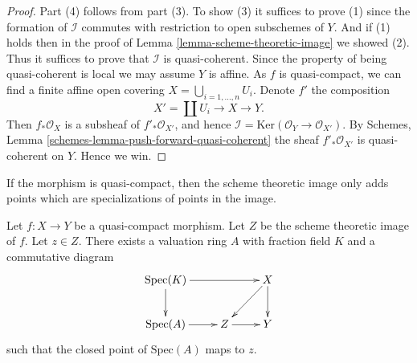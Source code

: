\begin{proof}
Part (4) follows from part (3). To show (3) it suffices
to prove (1) since the formation of $\mathcal{I}$ commutes with restriction to
open subschemes of $Y$. And if (1) holds then in
the proof of Lemma \ref{lemma-scheme-theoretic-image} we showed (2).
Thus it suffices to prove that $\mathcal{I}$ is quasi-coherent.
Since the property of being quasi-coherent is
local we may assume $Y$ is affine. As $f$ is quasi-compact,
we can find a finite affine open covering
$X = \bigcup_{i = 1, \ldots, n} U_i$. Denote $f'$ the composition
$$
X' = \coprod U_i \longrightarrow X \longrightarrow Y.
$$
Then $f_*\mathcal{O}_X$ is a subsheaf of $f'_*\mathcal{O}_{X'}$,
and hence $\mathcal{I} = \text{Ker}(\mathcal{O}_Y \to \mathcal{O}_{X'})$.
By Schemes, Lemma \ref{schemes-lemma-push-forward-quasi-coherent}
the sheaf $f'_*\mathcal{O}_{X'}$ is quasi-coherent on $Y$. Hence we win.
\end{proof}

\noindent
If the morphism is quasi-compact, then the scheme theoretic image only
adds points which are specializations of points in the image.

\begin{lemma}
\label{lemma-reach-points-scheme-theoretic-image}
Let $f : X \to Y$ be a quasi-compact morphism.
Let $Z$ be the scheme theoretic image of $f$.
Let $z \in Z$. There exists a valuation ring $A$ with
fraction field $K$ and a commutative diagram
$$
\xymatrix{
\text{Spec}(K) \ar[rr] \ar[d] & & X \ar[d] \ar[ld] \\
\text{Spec}(A) \ar[r] & Z \ar[r] & Y
}
$$
such that the closed point of $\text{Spec}(A)$ maps to $z$.
\end{lemma}

